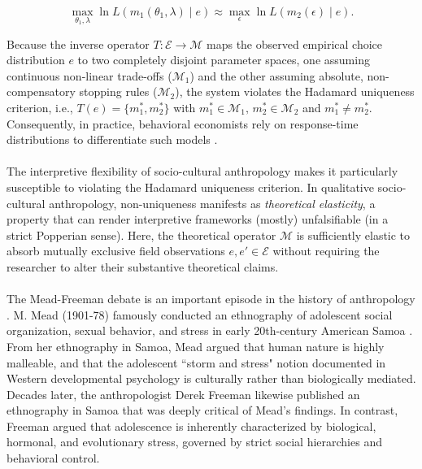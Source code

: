 \documentclass{article}
\theoremstyle{definition}
\begin{document}
\begin{equation}
\max_{\theta_1, \lambda} \ln L(m_1(\theta_1, \lambda) \mid e) \approx \max_{\epsilon} \ln L(m_2(\epsilon) \mid e).
\end{equation}

\noindent
Because the inverse operator $T: \mathcal{E} \to \mathcal{M}$ maps the observed empirical choice distribution $e$ to two completely disjoint parameter spaces, one assuming continuous non-linear trade-offs ($\mathcal{M}_1$) and the other assuming absolute, non-compensatory stopping rules ($\mathcal{M}_2$), the system violates the Hadamard uniqueness criterion, i.e., $T(e) = \{m_1^*, m_2^*\}$ with $m_1^* \in \mathcal{M}_1, \, m_2^* \in \mathcal{M}_2$ and $m_1^* \neq m_2^*$. Consequently, in practice, behavioral economists rely on response-time distributions to differentiate such models \cite{HCC23}. \\
\\
The interpretive flexibility of socio-cultural anthropology makes it particularly susceptible to violating the Hadamard uniqueness criterion. In qualitative socio-cultural anthropology, non-uniqueness manifests as \textit{theoretical elasticity}, a property that can render interpretive frameworks (mostly) unfalsifiable (in a strict Popperian sense). Here, the theoretical operator $\mathcal{M}$ is sufficiently elastic to absorb mutually exclusive field observations $e, e' \in \mathcal{E}$ without requiring the researcher to alter their substantive theoretical claims. \\
\\
The Mead-Freeman debate is an important episode in the history of anthropology \cite{Lea88}. M. Mead (1901-78) famously conducted an ethnography of adolescent social organization, sexual behavior, and stress in early 20th-century American Samoa \cite{Mea28}. From her ethnography in Samoa, Mead argued that human nature is highly malleable, and that the adolescent ``storm and stress" notion documented in Western developmental psychology \cite{Buc+23} is culturally rather than biologically mediated. Decades later, the anthropologist Derek Freeman likewise published an ethnography in Samoa \cite{Fre83} that was deeply critical of Mead's findings. In contrast, Freeman argued that adolescence is inherently characterized by biological, hormonal, and evolutionary stress, governed by strict social hierarchies and behavioral control. \\
\\
\end{document}
